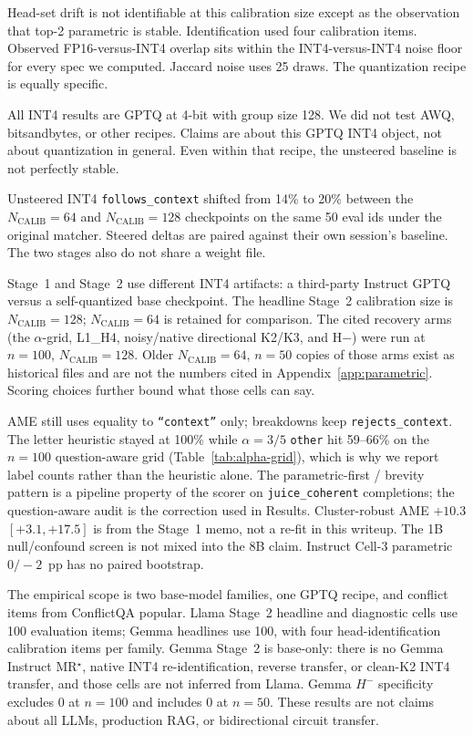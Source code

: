 \documentclass{article} %
\begin{document}
Head-set drift is not identifiable at this calibration size except as the observation that top-2 parametric is stable. Identification used four calibration items. Observed FP16-versus-INT4 overlap sits within the INT4-versus-INT4 noise floor for every spec we computed. Jaccard noise uses 25 draws. The quantization recipe is equally specific.

All INT4 results are GPTQ at 4-bit with group size 128. We did not test AWQ, bitsandbytes, or other recipes. Claims are about this GPTQ INT4 object, not about quantization in general. Even within that recipe, the unsteered baseline is not perfectly stable.

Unsteered INT4 \texttt{follows\_context} shifted from 14\% to 20\% between the $N_{\mathrm{CALIB}}{=}64$ and $N_{\mathrm{CALIB}}{=}128$ checkpoints on the same 50 eval ids under the original matcher. Steered deltas are paired against their own session's baseline. The two stages also do not share a weight file.

Stage~1 and Stage~2 use different INT4 artifacts: a third-party Instruct GPTQ versus a self-quantized base checkpoint. The headline Stage~2 calibration size is $N_{\mathrm{CALIB}}{=}128$; $N_{\mathrm{CALIB}}{=}64$ is retained for comparison. The cited recovery arms (the $\alpha$-grid, L1\_H4, noisy/native directional K2/K3, and H$-$) were run at $n{=}100$, $N_{\mathrm{CALIB}}{=}128$. Older $N_{\mathrm{CALIB}}{=}64$, $n{=}50$ copies of those arms exist as historical files and are not the numbers cited in Appendix~\ref{app:parametric}. Scoring choices further bound what those cells can say.

AME still uses equality to \texttt{``context''} only; breakdowns keep \texttt{rejects\_context}. The letter heuristic stayed at 100\% while $\alpha{=}3/5$ \texttt{other} hit 59--66\% on the $n{=}100$ question-aware grid (Table~\ref{tab:alpha-grid}), which is why we report label counts rather than the heuristic alone. The parametric-first / brevity pattern is a pipeline property of the scorer on \texttt{juice\_coherent} completions; the question-aware audit is the correction used in Results. Cluster-robust AME $+10.3$ $[+3.1, +17.5]$ is from the Stage~1 memo, not a re-fit in this writeup. The 1B null/confound screen is not mixed into the 8B claim. Instruct Cell-3 parametric $0/-2$~pp has no paired bootstrap.

The empirical scope is two base-model families, one GPTQ recipe, and conflict items from ConflictQA popular. Llama Stage~2 headline and diagnostic cells use 100 evaluation items; Gemma headlines use 100, with four head-identification calibration items per family. Gemma Stage~2 is base-only: there is no Gemma Instruct MR$^\star$, native INT4 re-identification, reverse transfer, or clean-K2 INT4 transfer, and those cells are not inferred from Llama. Gemma $H^{-}$ specificity excludes 0 at $n{=}100$ and includes 0 at $n{=}50$. These results are not claims about all LLMs, production RAG, or bidirectional circuit transfer.
\end{document}
